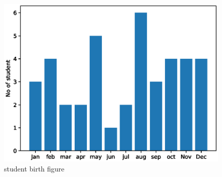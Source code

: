 \begin{figure}[!ht]
	\centering
	\includegraphics[width=\columnwidth]{./solutions/1-10/figures/prob/prob3.eps}
	\caption{student birth figure }
	\label{fig:1.2.3}
\end{figure}
